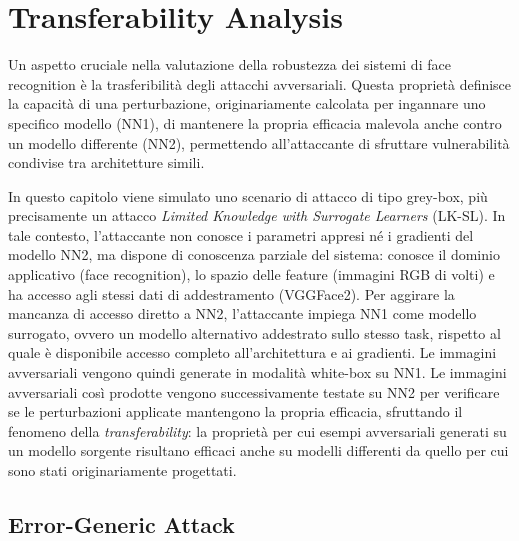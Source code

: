 \documentclass[a4paper, 12pt]{article}
\begin{document}
\clearpage
\section{Transferability Analysis}
Un aspetto cruciale nella valutazione della robustezza dei sistemi di face recognition è la trasferibilità degli attacchi avversariali. Questa proprietà definisce la capacità di una perturbazione, originariamente calcolata per ingannare uno specifico modello (NN1), di mantenere la propria efficacia malevola anche contro un modello differente (NN2), permettendo all'attaccante di sfruttare vulnerabilità condivise tra architetture simili.


In questo capitolo viene simulato uno scenario di attacco di tipo grey-box, più precisamente un attacco \textit{Limited Knowledge with Surrogate Learners} (LK-SL). In tale contesto, l'attaccante non conosce i parametri appresi né i gradienti del modello NN2, ma dispone di conoscenza parziale del sistema: conosce il dominio applicativo (face recognition), lo spazio delle feature (immagini RGB di volti) e ha accesso agli stessi dati di addestramento (VGGFace2).
Per aggirare la mancanza di accesso diretto a NN2, l'attaccante impiega NN1 come modello surrogato, ovvero un modello alternativo addestrato sullo stesso task, rispetto al quale è disponibile accesso completo all'architettura e ai gradienti. Le immagini avversariali vengono quindi generate in modalità white-box su NN1.
Le immagini avversariali così prodotte vengono successivamente testate su NN2 per verificare se le perturbazioni applicate mantengono la propria efficacia, sfruttando il fenomeno della \textit{transferability}: la proprietà per cui esempi avversariali generati su un modello sorgente risultano efficaci anche su modelli differenti da quello per cui sono stati originariamente progettati.

\vspace{15pt}

\subsection{Error-Generic Attack}
\end{document}
